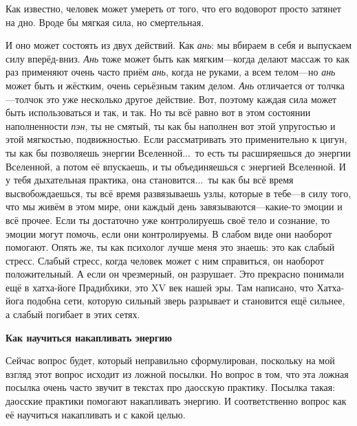 \A
Как известно, человек может умереть от того,
что его водоворот просто затянет на дно. Вроде бы мягкая сила, но смертельная.

\T
И оно может состоять из двух действий. Как {\it ань\/}: мы вбираем в
себя и выпускаем силу вперёд-вниз.
{\it Ань\/} тоже может быть как мягким---когда делают массаж то как раз применяют очень часто
приём {\it ань}, когда не руками, а всем телом---но
{\it ань\/} может быть и жёстким, очень серьёзным таким делом. {\it Ань\/} отличается
от толчка---толчок это уже несколько
другое действие. Вот, поэтому каждая сила может быть использоваться и так, и так.
Но ты всё равно вот в этом состоянии наполненности {\it пэн}, ты не смятый, ты как
бы наполнен вот этой упругостью и этой мягкостью, подвижностью.\hfil\break
\indent
Если рассматривать это применительно к цигун, ты как бы позволяешь энергии Вселенной...\ то
есть ты расширяешься до энергии Вселенной, а потом её впускаешь, и ты объединяешься с
энергией Вселенной.
И у тебя дыхательная практика, она становится...\ ты как бы всё время высвобождаешься, ты всё
время развязываешь узлы, которые в тебе---в силу того, что мы живём в этом мире, они каждый
день завязываются---какие-то эмоции и всё прочее. Если ты достаточно уже контролируешь
своё тело и сознание, то эмоции могут помочь, если они контролируемы.
В слабом виде они наоборот помогают.
Опять же, ты как психолог лучше меня это знаешь: это как слабый стресс. Слабый
стресс, когда человек может с ним справиться, он наоборот положительный. А если он
чрезмерный, он разрушает. Это прекрасно понимали ещё в хатха-йоге Прадибхики, это XV век нашей
эры. Там написано, что Хатха-йога подобна сети, которую сильный зверь разрывает и
становится ещё сильнее, а слабый погибает в этих сетях.

\null
\centerline{\bf Как научиться накапливать энергию}
\null

\A
Сейчас вопрос будет, который неправильно сформулирован, поскольку на мой взгляд
этот вопрос исходит из ложной посылки. Но вопрос в том, что эта ложная посылка очень часто
звучит в текстах про
даосскую практику. Посылка такая: даосские практики помогают накапливать энергию. И
соответственно вопрос как её научиться накапливать и с какой целью.

